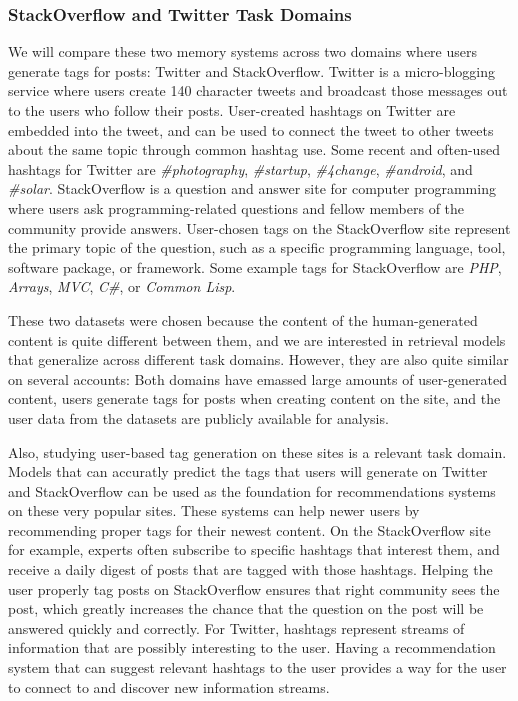 \documentclass[man,floatsintext]{apa6}
\begin{document}
\subsubsection{StackOverflow and Twitter Task Domains}

We will compare these two memory systems across two domains where users generate tags for posts: Twitter and StackOverflow.
Twitter is a micro-blogging service where users create 140 character tweets and broadcast those messages out to the users who follow their posts.
User-created hashtags on Twitter are embedded into the tweet, and can be used to connect the tweet to other tweets about the same topic through common hashtag use.
Some recent and often-used hashtags for Twitter are \emph{\#photography}, \emph{\#startup}, \emph{\#4change}, \emph{\#android}, and \emph{\#solar}.
StackOverflow is a question and answer site for computer programming where users ask programming-related questions and fellow members of the community provide answers.
User-chosen tags on the StackOverflow site represent the primary topic of the question, such as a specific programming language, tool, software package, or framework.
Some example tags for StackOverflow are \emph{PHP}, \emph{Arrays}, \emph{MVC}, \emph{C\#}, or \emph{Common Lisp}.

These two datasets were chosen because the content of the human-generated content is quite different between them, and we are interested in retrieval models that generalize across different task domains.
However, they are also quite similar on several accounts:
Both domains have emassed large amounts of user-generated content, users generate tags for posts when creating content on the site, and the user data from the datasets are publicly available for analysis.

Also, studying user-based tag generation on these sites is a relevant task domain.
Models that can accuratly predict the tags that users will generate on Twitter and StackOverflow can be used as the foundation for recommendations systems on these very popular sites.
These systems can help newer users by recommending proper tags for their newest content.
On the StackOverflow site for example, experts often subscribe to specific hashtags that interest them, and receive a daily digest of posts that are tagged with those hashtags.
Helping the user properly tag posts on StackOverflow ensures that right community sees the post, which greatly increases the chance that the question on the post will be answered quickly and correctly.
For Twitter, hashtags represent streams of information that are possibly interesting to the user.
Having a recommendation system that can suggest relevant hashtags to the user provides a way for the user to connect to and discover new information streams.
\end{document}
